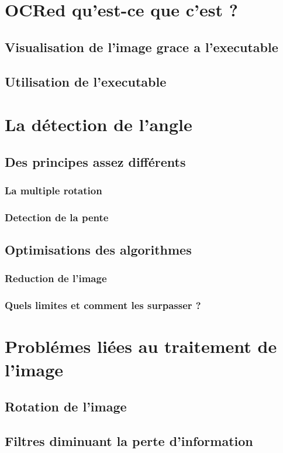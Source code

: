 \chapter{ OCRed qu'est-ce que c'est ? }

\section{ Visualisation de l'image grace a l'executable }
\section{ Utilisation de l'executable }
\chapter{ La d\'etection de l'angle }
\section{ Des principes assez diff\'erents}
\subsection{ La multiple rotation }
\subsection{ Detection de la pente }
\section{ Optimisations des algorithmes }
\subsection{ Reduction de l'image }
\subsection{ Quels limites et comment les surpasser ? }
\chapter{ Probl\'emes li\'ees au traitement de l'image }
\section{ Rotation de l'image}
\section{ Filtres diminuant la perte d'information}


